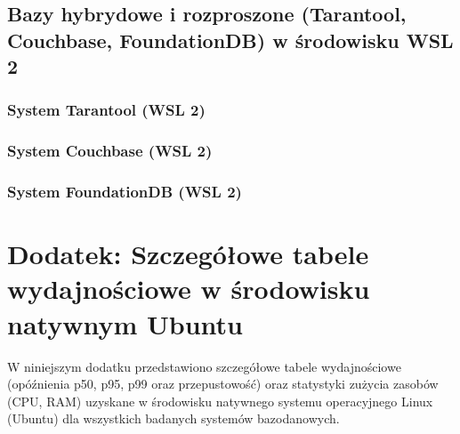 \section{Bazy hybrydowe i rozproszone (Tarantool, Couchbase, FoundationDB) w środowisku WSL 2}

\subsection{System Tarantool (WSL 2)}





\clearpage

\subsection{System Couchbase (WSL 2)}





\clearpage

\subsection{System FoundationDB (WSL 2)}





\clearpage


\chapter{Dodatek: Szczegółowe tabele wydajnościowe w środowisku natywnym Ubuntu}
\label{chap:dodatek_tabele_ubuntu}

W niniejszym dodatku przedstawiono szczegółowe tabele wydajnościowe (opóźnienia p50, p95, p99 oraz przepustowość) oraz statystyki zużycia zasobów (CPU, RAM) uzyskane w środowisku natywnego systemu operacyjnego Linux (Ubuntu) dla wszystkich badanych systemów bazodanowych.

